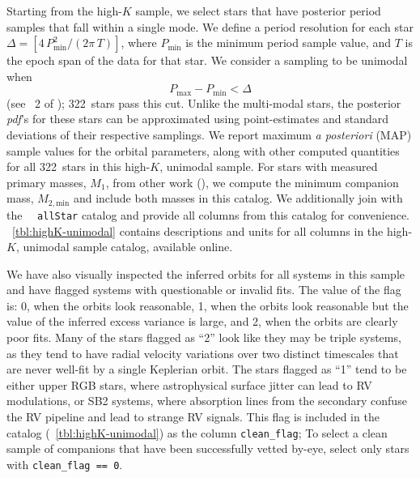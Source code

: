 \documentclass[modern, letterpaper]{aastex62}
\newcommand{\apogee}{\project{\acronym{APOGEE}}}
\newcommand{\DR}{\acronym{DR14}}
\newcommand{\pdf}{\textit{pdf}}
\newcommand{\nunimodal}{322}
\begin{document}
Starting from the high-$K$ sample, we select stars that have posterior period
samples that fall within a single mode.
We define a period resolution for each star $\Delta =
\left[4\,P_{\textrm{min}}^2 / (2\pi \, T) \right]$, where $P_{\textrm{min}}$ is
the minimum period sample value, and $T$ is the epoch span of the data for that
star.
We consider a sampling to be unimodal when
\begin{equation}
    P_{\textrm{max}} - P_{\textrm{min}} < \Delta \label{eq:unimodal}
\end{equation}
(see \sectionname~2 of \citealt{Price-Whelan:2017}); \nunimodal\ stars
pass this cut.
Unlike the multi-modal stars, the posterior \pdf 's for these stars can be
approximated using point-estimates and standard deviations of their respective
samplings.
We report maximum \textit{a posteriori} (MAP) sample values for the orbital
parameters, along with other computed quantities for all \nunimodal\ stars in
this high-$K$, unimodal sample.
For stars with measured primary masses, $M_1$, from other work
(\citealt{Ness:2015}), we compute the minimum companion mass, $M_{2,
\textrm{min}}$ and include both masses in this catalog.
We additionally join with the \apogee\ \DR\ \texttt{allStar} catalog and provide
all columns from this catalog for convenience.
\tablename~\ref{tbl:highK-unimodal} contains descriptions and units for all
columns in the high-$K$, unimodal sample catalog, available online.

We have also visually inspected the inferred orbits for all systems in this
sample and have flagged systems with questionable or invalid fits.
The value of the flag is: 0, when the orbits look reasonable, 1, when the orbits
look reasonable but the value of the inferred excess variance is large, and 2,
when the orbits are clearly poor fits.
Many of the stars flagged as ``2'' look like they may be triple systems, as they
tend to have radial velocity variations over two distinct timescales that are
never well-fit by a single Keplerian orbit.
The stars flagged as ``1'' tend to be either upper RGB stars, where
astrophysical surface jitter can lead to RV modulations, or SB2 systems, where
absorption lines from the secondary confuse the RV pipeline and lead to strange
RV signals.
This flag is included in the catalog (\tablename~\ref{tbl:highK-unimodal}) as
the column \texttt{clean\_flag}; To select a clean sample of companions that
have been successfully vetted by-eye, select only stars with
\texttt{clean\_flag == 0}.
\end{document}
